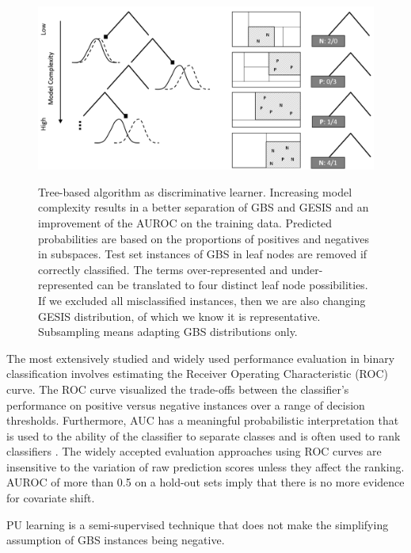 \begin{figure}[ht]
	\begin{center}
		\includegraphics[scale=0.32,angle=0]{fig/tree}
		\label{project}
		\caption{Tree-based algorithm as discriminative learner. Increasing model complexity results in a better separation of GBS and GESIS and an improvement of the AUROC on the training data. Predicted probabilities are based on the proportions of positives and negatives in subspaces. Test set instances of GBS in leaf nodes are removed if correctly classified. The terms over-represented and under-represented can be translated to four distinct leaf node possibilities. If we excluded all misclassified instances, then we are also changing GESIS distribution, of which we know it is representative. Subsampling means adapting GBS distributions only.}
	\end{center}
\end{figure}

The most extensively studied and widely used performance evaluation in binary classiﬁcation involves estimating the Receiver Operating Characteristic (ROC) curve. The ROC curve visualized the trade-offs between the classifier's performance on positive versus negative instances over a range of decision thresholds. Furthermore, AUC has a meaningful probabilistic interpretation that is used to the ability of the classiﬁer to separate classes and is often used to rank classiﬁers \cite{roc}. The widely accepted evaluation approaches using ROC curves are insensitive to the variation of raw prediction scores unless they affect the ranking. AUROC of more than 0.5 on a hold-out sets imply that there is no more evidence for covariate shift. 

\vspace{0.4cm}


PU learning is a semi-supervised technique that does not make the simplifying assumption of GBS instances being negative. 

